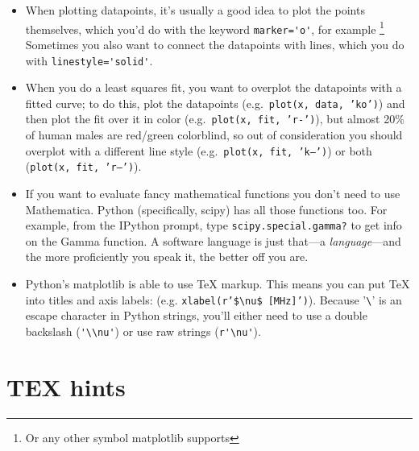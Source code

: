 \documentclass[12pt,preprint]{aastex}
\begin{document}
\begin{itemize}
\item When plotting datapoints, it's usually a good idea to plot the
  points themselves, which you'd do with the keyword \verb$marker='o'$, for
  example \footnote{Or any other symbol matplotlib supports}
    Sometimes you also want to connect the datapoints
  with lines, which you do with \verb$linestyle='solid'$.

\item When you do a least squares fit, you want to overplot the
  datapoints with a fitted curve; to do this, plot the datapoints
  (e.g.\ {\tt plot(x, data, 'ko')}) and then plot the fit over it
  in color (e.g.\ {\tt plot(x, fit, 'r-')}), but almost 20\% of human males are red/green
  colorblind, so out of consideration you should overplot with a
  different line style (e.g.\ {\tt plot(x, fit, 'k--')}) or both
  ({\tt plot(x, fit, 'r--')}).

\item If you want to evaluate fancy mathematical functions you don't
need to use Mathematica.  Python (specifically, scipy) has all those functions too.  For example,
from the IPython prompt, type \verb$scipy.special.gamma?$ to get info on the Gamma
function.  A software language is just that---a {\it language}---and the
more proficiently you speak it, the better off you are.  

\item Python's matplotlib is able to use TeX markup.  This means you can put TeX into
titles and axis labels: (e.g. {\tt xlabel(r'\$\verb$\$nu\$ [MHz]')}).  Because '\verb$\$'
is an escape character in Python strings, you'll either need to use a double backslash (\verb$'\\nu'$)
or use raw strings (\verb$r'\nu'$).

\end{itemize}

\section{TEX hints}
\end{document}
